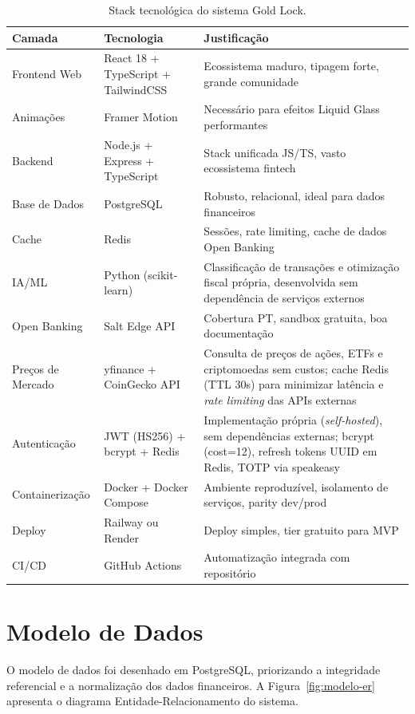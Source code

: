 \begin{table}[H]
\centering
\caption{Stack tecnológica do sistema Gold Lock.}
\label{tab:stack}
\small
\begin{tabularx}{\textwidth}{l l X}
\toprule
\textbf{Camada} & \textbf{Tecnologia} & \textbf{Justificação} \\
\midrule
Frontend Web & React 18 + TypeScript + TailwindCSS & Ecossistema maduro, tipagem forte, grande comunidade \\
Animações & Framer Motion & Necessário para efeitos Liquid Glass performantes \\
Backend & Node.js + Express + TypeScript & Stack unificada JS/TS, vasto ecossistema fintech \\
Base de Dados & PostgreSQL & Robusto, relacional, ideal para dados financeiros \\
Cache & Redis & Sessões, rate limiting, cache de dados Open Banking \\
IA/ML & Python (scikit-learn) & Classificação de transações e otimização fiscal própria, desenvolvida sem dependência de serviços externos \\
Open Banking & Salt Edge \ac{API} & Cobertura PT, sandbox gratuita, boa documentação \\
Preços de Mercado & yfinance + CoinGecko \ac{API} & Consulta de preços de ações, ETFs e criptomoedas sem custos; cache Redis (TTL 30s) para minimizar latência e \textit{rate limiting} das APIs externas \\
Autenticação & JWT (HS256) + bcrypt + Redis & Implementação própria (\textit{self-hosted}), sem dependências externas; bcrypt (cost=12), refresh tokens UUID em Redis, \ac{TOTP} via speakeasy \\
Containerização & Docker + Docker Compose & Ambiente reproduzível, isolamento de serviços, parity dev/prod \\
Deploy & Railway ou Render & Deploy simples, tier gratuito para \ac{MVP} \\
CI/CD & GitHub Actions & Automatização integrada com repositório \\
\bottomrule
\end{tabularx}
\end{table}


\section{Modelo de Dados}
\label{sec:arq-modelo-dados}

O modelo de dados foi desenhado em PostgreSQL, priorizando a integridade referencial e a normalização dos dados financeiros. A Figura~\ref{fig:modelo-er} apresenta o diagrama Entidade-Relacionamento do sistema.

